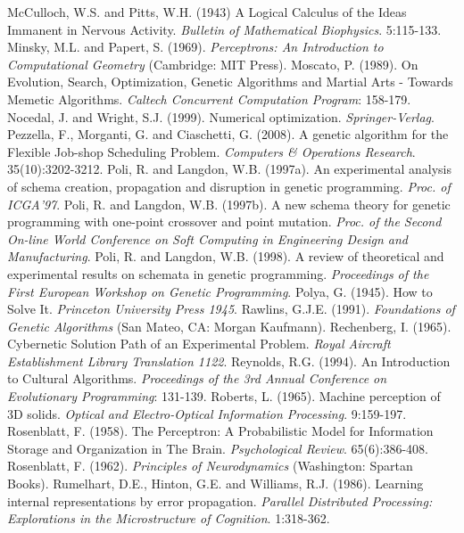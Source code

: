 \documentclass[spanish,a4paper,12pt,twoside]{report}
\begin{document}
\begin{thebibliography}{00}
   McCulloch, W.S. and Pitts, W.H. (1943) A Logical Calculus of the Ideas Immanent in Nervous Activity. \emph{Bulletin of Mathematical Biophysics}. 5:115-133.
   Minsky, M.L. and Papert, S. (1969). \emph{Perceptrons: An Introduction to Computational Geometry} (Cambridge: MIT Press).
   Moscato, P. (1989). On Evolution, Search, Optimization, Genetic Algorithms and Martial Arts - Towards Memetic Algorithms. \emph{Caltech Concurrent Computation Program}: 158-179.
   Nocedal, J. and Wright, S.J. (1999). Numerical optimization. \emph{Springer-Verlag}.
   Pezzella, F., Morganti, G. and Ciaschetti, G. (2008). A genetic algorithm for the Flexible Job-shop Scheduling Problem. \emph{Computers \& Operations Research}. 35(10):3202-3212.
   Poli, R. and Langdon, W.B. (1997a). An experimental analysis of schema creation, propagation and disruption in genetic programming. \emph{Proc. of ICGA'97}.
   Poli, R. and Langdon, W.B. (1997b). A new schema theory for genetic programming with one-point crossover and point mutation. \emph{Proc. of the Second On-line World Conference on Soft Computing in Engineering Design and Manufacturing}.
   Poli, R. and Langdon, W.B. (1998). A review of theoretical and experimental results on schemata in genetic programming. \emph{Proceedings of the First European Workshop on Genetic Programming}.
   Polya, G. (1945). How to Solve It. \emph{Princeton University Press 1945}.
   Rawlins, G.J.E. (1991). \emph{Foundations of Genetic Algorithms} (San Mateo, CA: Morgan Kaufmann).
   Rechenberg, I. (1965). Cybernetic Solution Path of an Experimental Problem. \emph{Royal Aircraft Establishment Library Translation 1122}.
   Reynolds, R.G. (1994). An Introduction to Cultural Algorithms. \emph{Proceedings of the 3rd Annual Conference on Evolutionary Programming}: 131-139.
   Roberts, L. (1965). Machine perception of 3D solids. \emph{Optical and Electro-Optical Information Processing}. 9:159-197.
   Rosenblatt, F. (1958). The Perceptron: A Probabilistic Model for Information Storage and Organization in The Brain. \emph{Psychological Review}. 65(6):386-408.
   Rosenblatt, F. (1962). \emph{Principles of Neurodynamics} (Washington: Spartan Books). 
   Rumelhart, D.E., Hinton, G.E. and Williams, R.J. (1986). Learning internal representations by error propagation. \emph{Parallel Distributed Processing: Explorations in the Microstructure of Cognition}. 1:318-362.

\end{thebibliography}
\end{document}
